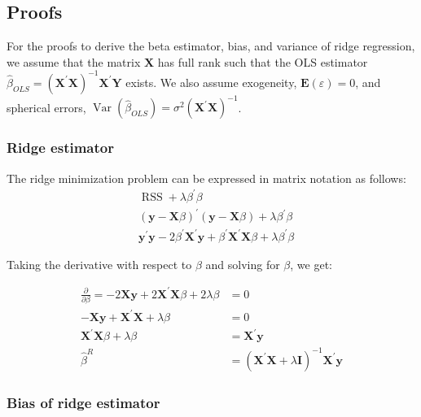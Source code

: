 \subsection{Proofs}\label{proofs}

For the proofs to derive the beta estimator, bias, and variance of ridge regression, we assume that the matrix $\mathbf{X}$ has full rank such that the OLS estimator $\hat{\beta}_{OLS}=(\mathbf{X}^{\prime} \mathbf{X})^{-1} \mathbf{X}^{\prime} \mathbf{Y}$ exists. We also assume exogeneity, $\mathbf{E}(\varepsilon)=0$, and spherical errors, $\operatorname{Var}(\hat{\beta}_{OLS})=\sigma^2(\mathbf{X}^{\prime} \mathbf{X})^{-1} $. 

\subsubsection{Ridge estimator}\label{proof:ridgeestimate}

\noindent The ridge minimization problem can be expressed in matrix notation as follows:
\begin{align*}
& \operatorname{RSS} + \lambda \beta^{\prime} \beta \\
& (\mathbf{y} - \mathbf{X}\beta)^{\prime}(\mathbf{y} - \mathbf{X}\beta) + \lambda \beta^{\prime}\beta \\
& \mathbf{y^{\prime}} \mathbf{y} -2\beta^{\prime}\mathbf{X}^{\prime}\mathbf{y} + \beta^{\prime}\mathbf{X}^{\prime}\mathbf{X}\beta + \lambda \beta^{\prime}\beta
\end{align*}

\noindent Taking the derivative with respect to $\beta$ and solving for $\beta$, we get:

\begin{align*}
 \frac{\partial}{\partial \beta} = -2 \mathbf{X}\mathbf{y} + 2 \mathbf{X}^{\prime}\mathbf{X}\beta + 2\lambda\beta &=0 \\
-\mathbf{X}\mathbf{y} +  \mathbf{X}^{\prime} \mathbf{X} + \lambda\beta&=0 \\
\mathbf{X}^{\prime} \mathbf{X}\beta+\lambda\beta&= \mathbf{X}^{\prime} \mathbf{y} \\
\hat{\beta}^{R}&= (\mathbf{X}^{\prime} \mathbf{X} + \lambda \mathbf{I})^{-1} \mathbf{X}^{\prime} \mathbf{y}
\end{align*}

\subsubsection{Bias of ridge estimator} \label{proofbias}

